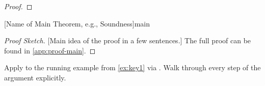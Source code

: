 \begin{proof}

\end{proof}

\begin{Theorem}{[Name of Main Theorem, e.g., Soundness]}{main}

\end{Theorem}

\begin{proof}[Proof Sketch]
    [Main idea of the proof in a few sentences.]
    The full proof can be found in \cref{app:proof-main}.
\end{proof}

\begin{example}\label{ex:main}
    Apply  to the running example from \cref{ex:key1} via .
    Walk through every step of the argument explicitly.
\end{example}